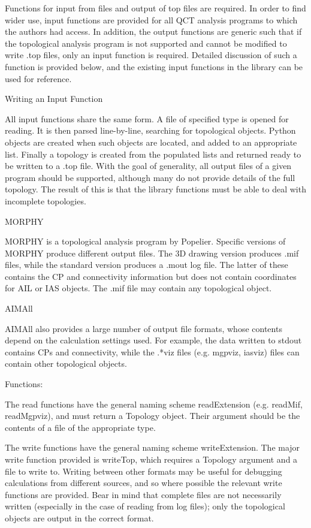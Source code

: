 \documentclass{tufte-book}
\begin{document}
Functions for input from files and output of top files are required. In order to find wider use, input functions are provided for all QCT analysis programs to which the authors had access. In addition, the output functions are generic such that if the topological analysis program is not supported and cannot be modified to write .top files, only an input function is required. Detailed discussion of such a function is provided below, and the existing input functions in the library can be used for reference.

Writing an Input Function

All input functions share the same form. A file of specified type is opened for reading. It is then parsed line-by-line, searching for topological objects. Python objects are created when such objects are located, and added to an appropriate list. Finally a topology is created from the populated lists and returned ready to be written to a .top file. With the goal of generality, all output files of a given program should be supported, although many do not provide details of the full topology. The result of this is that the library functions must be able to deal with incomplete topologies.

MORPHY

MORPHY is a topological analysis program by Popelier. Specific versions of MORPHY produce different output files. The 3D drawing version produces .mif files, while the standard version produces a .mout log file. The latter of these contains the CP and connectivity information but does not contain coordinates for AIL or IAS objects. The .mif file may contain any topological object.

AIMAll

AIMAll also provides a large number of output file formats, whose contents depend on the calculation settings used. For example, the data written to stdout contains CPs and connectivity, while the .*viz files (e.g. mgpviz, iasviz) files can contain other topological objects.

Functions:

The read functions have the general naming scheme readExtension (e.g. readMif, readMgpviz), and must return a Topology object. Their argument should be the contents of a file of the appropriate type.

The write functions have the general naming scheme writeExtension. The major write function provided is writeTop, which requires a Topology argument and a file to write to. Writing between other formats may be useful for debugging calculations from different sources, and so where possible the relevant write functions are provided. Bear in mind that complete files are not necessarily written (especially in the case of reading from log files); only the topological objects are output in the correct format.
\end{document}
